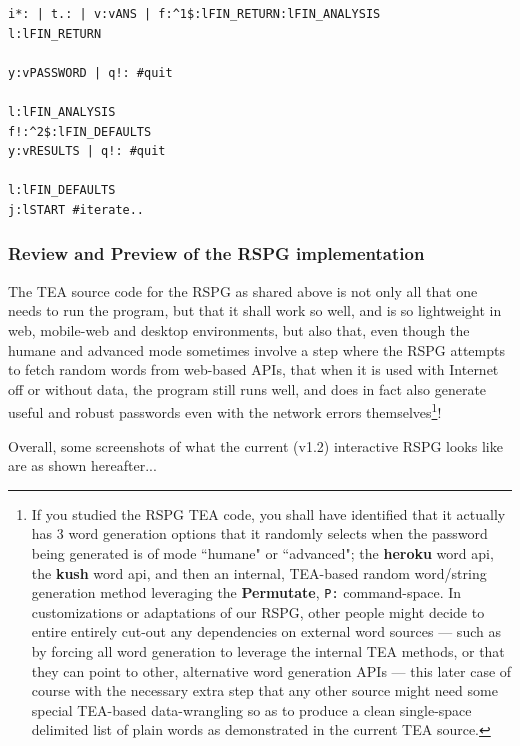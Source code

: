 \documentclass[a4paper, 18pt]{book} %
\begin{document}
{{{{\begin{tcolorbox}[teaterminalstyle, title=TEA Program: Random Secure Password Generator v1.2, breakable]
\begin{lstlisting}[language=TEA,breaklines=true,]
i*: | t.: | v:vANS | f:^1$:lFIN_RETURN:lFIN_ANALYSIS
l:lFIN_RETURN

y:vPASSWORD | q!: #quit

l:lFIN_ANALYSIS
f!:^2$:lFIN_DEFAULTS
y:vRESULTS | q!: #quit

l:lFIN_DEFAULTS
j:lSTART #iterate..
   \end{lstlisting}
  \end{tcolorbox}
  \caption{TEA APPLICATION: Random Secure Password Generator (RSPG) v1.2}
  \label{FIGVAPP1}
}


\subsubsection{Review and Preview of the RSPG implementation}


The TEA source code for the RSPG as shared above is not only all that one needs to run the program, but that it shall work so well, and is so lightweight in web, mobile-web and desktop environments, but also that, even though the humane and advanced mode sometimes involve a step where the RSPG attempts to fetch random words from web-based APIs, that when it is used with Internet off or without data, the program still runs well, and does in fact also generate useful and robust passwords even with the network errors themselves\footnote{If you studied the RSPG TEA code, you shall have identified that it actually has 3 word generation options that it randomly selects when the password being generated is of mode ``humane" or ``advanced"; the \textbf{heroku} word api, the \textbf{kush} word api, and then an internal, TEA-based random word/string generation method leveraging the \textbf{Permutate}, \texttt{P:} command-space. In customizations or adaptations of our RSPG, other people might decide to entire entirely cut-out any dependencies on external word sources --- such as by forcing all word generation to leverage the internal TEA methods, or that they can point to other, alternative word generation APIs --- this later case of course with the necessary extra step that any other source might need some special TEA-based data-wrangling so as to produce a clean single-space delimited list of plain words as demonstrated in the current TEA source.}!

Overall, some screenshots of what the current (v1.2) interactive RSPG looks like are as shown hereafter...


\begin{figure}[H]
  \centering
  

\end{figure}}}}
\end{document}
